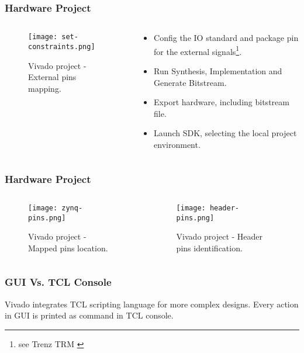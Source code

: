 \begin{frame}
	\frametitle{Hardware Project}
	\begin{columns}
		\begin{column}{0.5\textwidth}
			\begin{figure}
				\texttt{[image: set-constraints.png]}
				\caption{Vivado project - External pins mapping.}\label{fig:set-constraints}
			\end{figure}
		\end{column}
		\begin{column}{0.5\textwidth}
			\begin{itemize}
				\item Config the IO standard and package pin for the external signals\footnote[frame]{see Trenz TRM \cite{zynq-trm}}.
				\item Run Synthesis, Implementation and Generate Bitstream.
				\item Export hardware, including bitstream file.
				\item Launch SDK, selecting the local project environment.
			\end{itemize}
		\end{column}
	\end{columns}
\end{frame}

\begin{frame}
	\frametitle{Hardware Project}
	\begin{columns}
		\begin{column}{0.5\textwidth}
			\begin{figure}
				\texttt{[image: zynq-pins.png]}
				\caption{Vivado project - Mapped pins location.}\label{fig:zynq-pins}
			\end{figure}
		\end{column} \pause
		\begin{column}{0.5\textwidth}
			\begin{figure}
				\texttt{[image: header-pins.png]}
				\caption{Vivado project - Header pins identification.}\label{fig:header-pins}
			\end{figure}
		\end{column}
	\end{columns}
\end{frame}

\begin{frame}
	\frametitle{GUI Vs. TCL Console}
	Vivado integrates TCL scripting language for more complex designs. Every action in GUI is printed as command in TCL console.
	\vfill
	
\end{frame}

